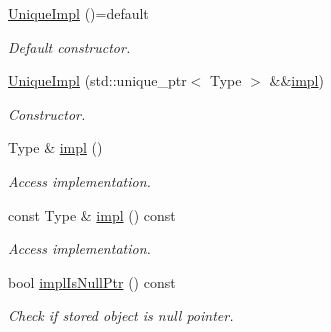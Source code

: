 \begin{DoxyCompactItemize}
\item 
\hypertarget{classSpacy_1_1Mixin_1_1UniqueImpl_ae24356ea93af338e7bc0f1a63ef00ca7}{}\hyperlink{classSpacy_1_1Mixin_1_1UniqueImpl_ae24356ea93af338e7bc0f1a63ef00ca7}{Unique\+Impl} ()=default\label{classSpacy_1_1Mixin_1_1UniqueImpl_ae24356ea93af338e7bc0f1a63ef00ca7}

\begin{DoxyCompactList}\small\item\em Default constructor. \end{DoxyCompactList}\item 
\hyperlink{classSpacy_1_1Mixin_1_1UniqueImpl_a373c260ea64be0cd24f36507cfbe3071_a373c260ea64be0cd24f36507cfbe3071}{Unique\+Impl} (std\+::unique\+\_\+ptr$<$ Type $>$ \&\&\hyperlink{classSpacy_1_1Mixin_1_1UniqueImpl_ae183ae8b045db161111f761a32703547}{impl})
\begin{DoxyCompactList}\small\item\em Constructor. \end{DoxyCompactList}\item 
\hypertarget{classSpacy_1_1Mixin_1_1UniqueImpl_ae183ae8b045db161111f761a32703547}{}Type \& \hyperlink{classSpacy_1_1Mixin_1_1UniqueImpl_ae183ae8b045db161111f761a32703547}{impl} ()\label{classSpacy_1_1Mixin_1_1UniqueImpl_ae183ae8b045db161111f761a32703547}

\begin{DoxyCompactList}\small\item\em Access implementation. \end{DoxyCompactList}\item 
\hypertarget{classSpacy_1_1Mixin_1_1UniqueImpl_a71074aa0d62f8c6f718c6db655319c0d}{}const Type \& \hyperlink{classSpacy_1_1Mixin_1_1UniqueImpl_a71074aa0d62f8c6f718c6db655319c0d}{impl} () const \label{classSpacy_1_1Mixin_1_1UniqueImpl_a71074aa0d62f8c6f718c6db655319c0d}

\begin{DoxyCompactList}\small\item\em Access implementation. \end{DoxyCompactList}\item 
\hypertarget{classSpacy_1_1Mixin_1_1UniqueImpl_aa7dfb0cb756d6d0419bbac6fb8cac8dc}{}bool \hyperlink{classSpacy_1_1Mixin_1_1UniqueImpl_aa7dfb0cb756d6d0419bbac6fb8cac8dc}{impl\+Is\+Null\+Ptr} () const \label{classSpacy_1_1Mixin_1_1UniqueImpl_aa7dfb0cb756d6d0419bbac6fb8cac8dc}

\begin{DoxyCompactList}\small\item\em Check if stored object is null pointer. \end{DoxyCompactList}\end{DoxyCompactItemize}


